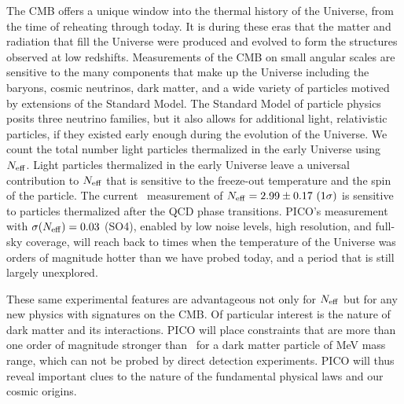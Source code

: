 \documentclass[PICOReport.tex]{subfiles}
\begin{document}
The CMB offers a unique window into the thermal history of the Universe, from the time of reheating through today.  It is during these eras that the matter and radiation that fill the Universe were produced and evolved to form the structures observed at low redshifts.  Measurements of the CMB on small angular scales are sensitive to the many components that make up the Universe including the baryons, cosmic neutrinos, dark matter, and a wide variety of particles motived by extensions of the Standard Model.  The Standard Model of particle physics posits three neutrino families, but it also allows for additional light, relativistic particles, if they existed early enough during the evolution of the Universe.   We count the total number light particles thermalized in the early Universe using ${N_{\rm eff}}$. Light particles thermalized in the early Universe leave a universal contribution to ${N_{\rm eff}}$ that is sensitive to the freeze-out temperature and the spin of the particle.  The current \planck\ measurement of ${N_{\rm eff}} = 2.99 \pm 0.17 \,\, (1\sigma)$ is sensitive to particles thermalized after the QCD phase transitions. PICO's measurement with $\sigma({N_{\rm eff}})=0.03$ (SO4), enabled by low noise levels, high resolution, and full-sky coverage, will reach back to times when the temperature of the Universe was orders of magnitude hotter than we have probed today, and a period that is still largely unexplored.   

These same experimental features are advantageous not only for ${N_{\rm eff}}$ but for any new physics with signatures on the CMB. Of particular interest is the nature of dark matter and its interactions. PICO will place constraints that are more than one order of magnitude stronger than \planck\ for a dark matter particle of MeV mass range, which can not be probed by direct detection experiments. PICO will thus reveal important clues to the nature of the fundamental physical laws and our cosmic origins. 


\end{document}
